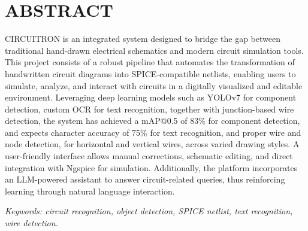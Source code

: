 

\chapter*{ABSTRACT}
{}


\bigskip
CIRCUITRON is an integrated system designed to bridge the gap between traditional 
hand-drawn electrical schematics and modern circuit simulation tools. This project 
consists of a robust pipeline that automates the transformation of handwritten circuit 
diagrams into SPICE-compatible netlists, enabling users to simulate, analyze, and 
interact with circuits in a digitally visualized and editable environment. Leveraging 
deep learning models such as YOLOv7 for component detection, custom OCR for text 
recognition, together with junction-based wire detection, the system has achieved a 
mAP@0.5 of 83\% for component detection, and expects character accuracy of 75\% for 
text recognition, and proper wire and node detection, for horizontal and vertical wires, 
across varied drawing styles. A user-friendly interface allows manual corrections, 
schematic editing, and direct integration with Ngspice for simulation. Additionally, the 
platform incorporates an LLM-powered assistant to answer circuit-related queries, thus 
reinforcing learning through natural language interaction.

\vspace{1em}
\noindent\textit{Keywords: circuit recognition, object detection, SPICE netlist, text recognition, wire detection.}